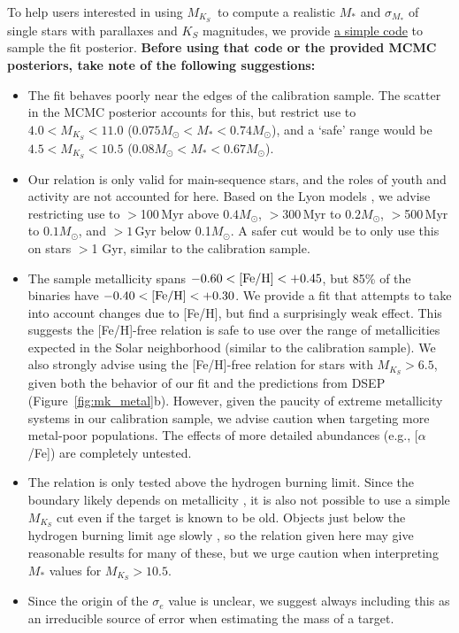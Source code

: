 \documentclass[twocolumn]{aastex62}
\newcommand{\mks}{$M_{K_S}$}
\begin{document}
To help users interested in using \mks\ to compute a realistic $M_*$ and $\sigma_{M_*}$ of single stars with parallaxes and $K_S$ magnitudes, we provide \href{https://github.com/awmann/M_-M_K-}{a simple code} to sample the fit posterior. {\bf Before using that code or the provided MCMC posteriors, take note of the following suggestions:}
\begin{itemize}
\item The fit behaves poorly near the edges of the calibration sample. The scatter in the MCMC posterior accounts for this, but restrict use to $4.0<M_{K_S}<11.0$ ($0.075M_\odot<M_*<0.74M_\odot$), and a `safe' range would be $4.5<M_{K_S}<10.5$ ($0.08M_\odot<M_*<0.67M_\odot$). 

\item Our relation is only valid for main-sequence stars, and the roles of youth and activity are not accounted for here. Based on the Lyon models \citep{BHAC15}, we advise restricting use to $>$100\,Myr above $0.4M_\odot$, $>$300\,Myr to $0.2M_\odot$, $>$500\,Myr to $0.1M_\odot$, and $>1$\,Gyr below 0.1$M_\odot$. A safer cut would be to only use this on stars $>$1 Gyr, similar to the calibration sample. 

\item The sample metallicity spans $-0.60<\rm{[Fe/H]}<+0.45$, but 85\% of the binaries have $-0.40<\rm{[Fe/H]}<+0.30$. We provide a fit that attempts to take into account changes due to [Fe/H], but find a surprisingly weak effect. This suggests the [Fe/H]-free relation is safe to use over the range of metallicities expected in the Solar neighborhood (similar to the calibration sample). We also strongly advise using the [Fe/H]-free relation for stars with \mks$>6.5$, given both the behavior of our fit and the predictions from DSEP (Figure~\ref{fig:mk_metal}b). However, given the paucity of extreme metallicity systems in our calibration sample, we advise caution when targeting more metal-poor populations. The effects of more detailed abundances (e.g., [$\alpha$/Fe]) are completely untested.

\item The relation is only tested above the hydrogen burning limit. Since the boundary likely depends on metallicity \citep{2001RvMP...73..719B}, it is also not possible to use a simple $M_{K_S}$ cut even if the target is known to be old. Objects just below the hydrogen burning limit age slowly \citep{BHAC15}, so the relation given here may give reasonable results for many of these, but we urge caution when interpreting $M_*$ values for $M_{K_S}>10.5$. 

\item Since the origin of the $\sigma_e$ value is unclear, we suggest always including this as an irreducible source of error when estimating the mass of a target. 

\end{itemize}
\end{document}
